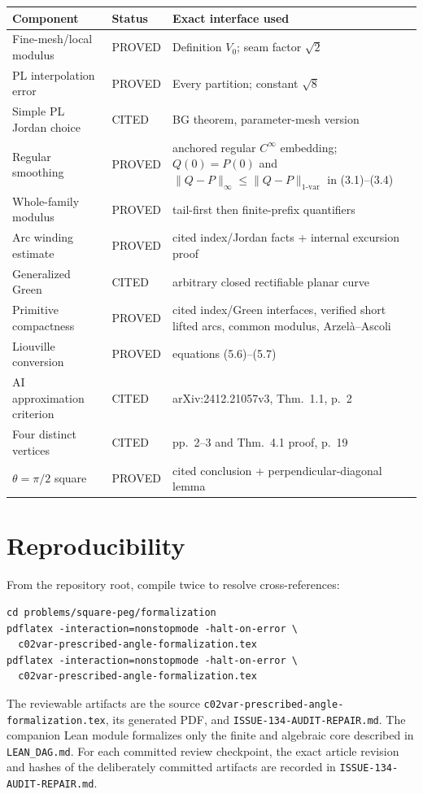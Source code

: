 \documentclass[11pt]{article}
\theoremstyle{definition}
\theoremstyle{remark}
\begin{document}
\begin{center}
\begin{tabular}{>{\raggedright\arraybackslash}p{}
>{\raggedright\arraybackslash}p{}
>{\raggedright\arraybackslash}p{}}
Component & Status & Exact interface used \\
\hline
Fine-mesh/local modulus & PROVED & Definition $V_0$; seam factor $\sqrt2$ \\
PL interpolation error & PROVED & Every partition; constant $\sqrt8$ \\
Simple PL Jordan choice & CITED & BG theorem, parameter-mesh version \\
Regular smoothing & PROVED & anchored regular $C^\infty$ embedding;
$Q(0)=P(0)$ and $\|Q-P\|_\infty\leq\|Q-P\|_{1\text{-var}}$ in
(3.1)--(3.4) \\
Whole-family modulus & PROVED & tail-first then finite-prefix quantifiers \\
Arc winding estimate & PROVED & cited index/Jordan facts + internal excursion proof \\
Generalized Green & CITED & arbitrary closed rectifiable planar curve \\
Primitive compactness & PROVED & cited index/Green interfaces,
verified short lifted arcs, common modulus, Arzel\`a--Ascoli \\
Liouville conversion & PROVED & equations (5.6)--(5.7) \\
AI approximation criterion & CITED & arXiv:2412.21057v3, Thm.~1.1, p.~2 \\
Four distinct vertices & CITED & pp.~2--3 and Thm.~4.1 proof, p.~19 \\
$\theta=\pi/2$ square & PROVED & cited conclusion + perpendicular-diagonal lemma \\
\end{tabular}
\end{center}

\section{Reproducibility}

From the repository root, compile twice to resolve cross-references:
\begin{verbatim}
cd problems/square-peg/formalization
pdflatex -interaction=nonstopmode -halt-on-error \
  c02var-prescribed-angle-formalization.tex
pdflatex -interaction=nonstopmode -halt-on-error \
  c02var-prescribed-angle-formalization.tex
\end{verbatim}
The reviewable artifacts are the source
\texttt{c02var-prescribed-angle-formalization.tex}, its generated PDF, and
\texttt{ISSUE-134-AUDIT-REPAIR.md}.  The companion Lean module formalizes
only the finite and algebraic core described in \texttt{LEAN\_DAG.md}.
For each committed review checkpoint, the exact article revision and hashes
of the deliberately committed artifacts are recorded in
\texttt{ISSUE-134-AUDIT-REPAIR.md}.
\end{document}
